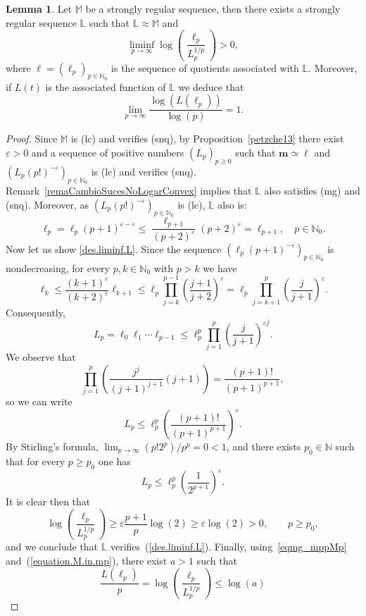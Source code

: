\documentclass[11pt,a4paper]{article}
\theoremstyle{definition}
\newtheorem{lemma}[theo]{Lemma}
\def\oo{\infty}
\def\ri{\rightarrow}
\def\ep{\varepsilon}
\def\bl{\boldsymbol{\ell}}
\def\N{\mathbb{N}}
\def\M{\mathbb{M}}
\def\L{\mathbb{L}} %
\def\m{\boldsymbol{m}}
\begin{document}
\begin{lemma}\label{lemmaliminfcierto}
Let $\M$ be a strongly regular sequence, then there exists a strongly regular sequence $\L$ such that $\L\approx\M$ and
\begin{equation}\label{des.liminf.L}
\liminf_{p\ri\oo} \log\left(\frac{\ell_p}{L^{1/p}_p}\right)>0,
\end{equation}
where $\bl=(\ell_p)_{p\in\N_0}$ is the sequence of quotients associated with $\L$. Moreover, if $L(t)$ is the associated function of $\L$ we deduce that
\begin{equation}
\lim_{p\ri\oo} \frac{\log(L(\ell_p))}{\log(p)}=1.\label{limit.logfunctionL.over.p.equal.1}
\end{equation}

\end{lemma}
\begin{proof}
Since $\M$ is (lc) and verifies (snq), by Proposition~\ref{petzche13} there exist $\ep>0$ and a sequence of positive numbers $(L_p)_{p\geq0}$ such that
$\m\simeq\bl$ and $(L_p (p!)^{-\ep})_{p\in\N_0}$ is (lc)
and verifies (snq). Remark~\ref{remaCambioSucesNoLogarConvex}  implies that
$\L$ also satisfies (mg) and (snq). Moreover, as $(L_p (p!)^{-\ep})_{p\in\N_0}$  is (lc), $\L$  also is: 
$$\ell_p=\ell_p (p+1)^{\ep-\ep} \leq \frac{\ell_{p+1}}{(p+2)^\ep} (p+2)^\ep = \ell_{p+1},\quad p\in\N_0.
$$
Now let us show \eqref{des.liminf.L}.
Since the sequence $(\ell_p (p+1)^{-\ep})_{p\in\N_0}$ is nondecreasing, for every  $p,k\in\N_0$ with $p>k$ we have
 $$\ell_k\leq \frac{(k+1)^\ep}{(k+2)^\ep} \ell_{k+1} \leq \ell_p \prod_{j=k}^{p-1} \left( \frac{j+1}{j+2} \right)^\ep= \ell_p \prod_{j=k+1}^{p} \left( \frac{j}{j+1} \right)^\ep.$$
 Consequently,
 $$ L_p=\ell_0\ell_1\cdots \ell_{p-1}\leq \ell^p_p \prod_{j=1}^{p} \left( \frac{j}{j+1} \right)^{\ep j }.$$
We observe that
$$\prod_{j=1}^{p} \left( \frac{j^j}{(j+1)^{j+1}} (j+1) \right)= \frac{(p+1)!}{(p+1)^{p+1}}, $$
so we can write
$$ L_p\leq \ell^p_p  \left(\frac{(p+1)!}{(p+1)^{p+1}} \right)^{\ep }.$$
 By Stirling's formula, $\lim_{p\ri\oo} (p! 2^p) /  p^p = 0<1$, and there exists $p_0\in\N$ such that for every $p\geq p_0$ one has
 $$ L_p\leq \ell^p_p  \left( \frac{1}{2^{p+1}}\right)^{\ep }.$$
 It is clear then that
 $$  \log\left( \frac{\ell_p}{L^{1/p}_p}\right)\geq \ep  \frac{p+1}{p} \log(2) \geq \ep \log(2) >0, \qquad p\geq p_0,$$
and we conclude that $\L$ verifies~(\ref{des.liminf.L}). Finally, using~\eqref{eqmg_mppMp} and~(\ref{equation.M.in.mp}),
there  exist $a>1$ such that
 $$\frac{L(\ell_p)}{p}=\log \left(\frac{\ell_p}{L^{1/p}_p}\right) \leq \log (a)$$

\end{proof}
\end{document}
